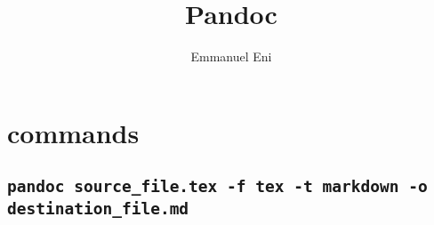 \documentclass{article}
\title{Pandoc}
\author{Emmanuel Eni}
\begin{document}
\maketitle
\section{commands}
\subsection{\texttt{pandoc source\_file.tex -f tex -t markdown -o destination\_file.md}}
\end{document}
